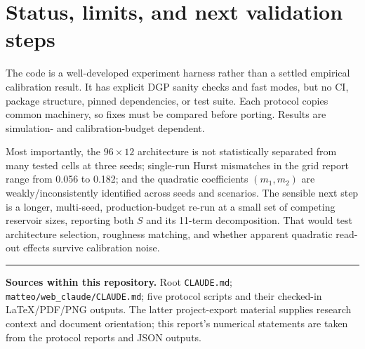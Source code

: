 \documentclass[10pt,a4paper]{article}
\begin{document}
\section{Status, limits, and next validation steps}
The code is a well-developed experiment harness rather than a settled empirical calibration result.  It has explicit DGP sanity checks and fast modes, but no CI, package structure, pinned dependencies, or test suite.  Each protocol copies common machinery, so fixes must be compared before porting.  Results are simulation- and calibration-budget dependent.

Most importantly, the $96\times12$ architecture is not statistically separated from many tested cells at three seeds; single-run Hurst mismatches in the grid report range from 0.056 to 0.182; and the quadratic coefficients $(m_1,m_2)$ are weakly/inconsistently identified across seeds and scenarios.  The sensible next step is a longer, multi-seed, production-budget re-run at a small set of competing reservoir sizes, reporting both $S$ and its 11-term decomposition.  That would test architecture selection, roughness matching, and whether apparent quadratic read-out effects survive calibration noise.

\vspace{.3em}\hrule\vspace{.35em}
\small\textbf{Sources within this repository.} Root \texttt{CLAUDE.md}; \texttt{matteo/web\_claude/CLAUDE.md}; five protocol scripts and their checked-in LaTeX/PDF/PNG outputs.  The latter project-export material supplies research context and document orientation; this report's numerical statements are taken from the protocol reports and JSON outputs.
\end{document}

